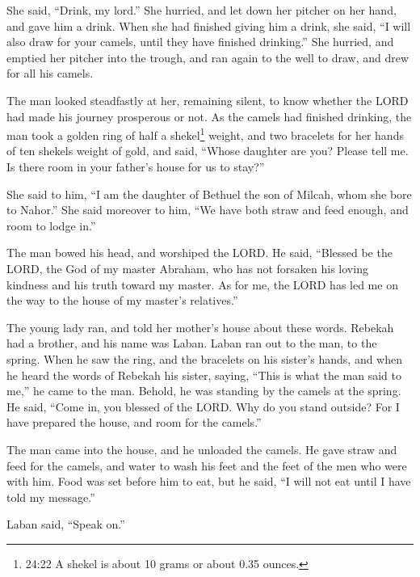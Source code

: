 \myverse{}She said, “Drink, my lord.” She hurried, and let down her pitcher on her hand, and gave him a drink. \myverse{}When she had finished giving him a drink, she said, “I will also draw for your camels, until they have finished drinking.” \myverse{}She hurried, and emptied her pitcher into the trough, and ran again to the well to draw, and drew for all his camels.

\myverse{}The man looked steadfastly at her, remaining silent, to know whether the LORD had made his journey prosperous or not. \myverse{}As the camels had finished drinking, the man took a golden ring of half a shekel\footnote{24:22 A shekel is about 10 grams or about 0.35 ounces.} weight, and two bracelets for her hands of ten shekels weight of gold, \myverse{}and said, “Whose daughter are you? Please tell me. Is there room in your father’s house for us to stay?”

\myverse{}She said to him, “I am the daughter of Bethuel the son of Milcah, whom she bore to Nahor.” \myverse{}She said moreover to him, “We have both straw and feed enough, and room to lodge in.”

\myverse{}The man bowed his head, and worshiped the LORD. \myverse{}He said, “Blessed be the LORD, the God of my master Abraham, who has not forsaken his loving kindness and his truth toward my master. As for me, the LORD has led me on the way to the house of my master’s relatives.”

\myverse{}The young lady ran, and told her mother’s house about these words. \myverse{}Rebekah had a brother, and his name was Laban. Laban ran out to the man, to the spring. \myverse{}When he saw the ring, and the bracelets on his sister’s hands, and when he heard the words of Rebekah his sister, saying, “This is what the man said to me,” he came to the man. Behold, he was standing by the camels at the spring. \myverse{}He said, “Come in, you blessed of the LORD. Why do you stand outside? For I have prepared the house, and room for the camels.”

\myverse{}The man came into the house, and he unloaded the camels. He gave straw and feed for the camels, and water to wash his feet and the feet of the men who were with him. \myverse{}Food was set before him to eat, but he said, “I will not eat until I have told my message.”

Laban said, “Speak on.”

